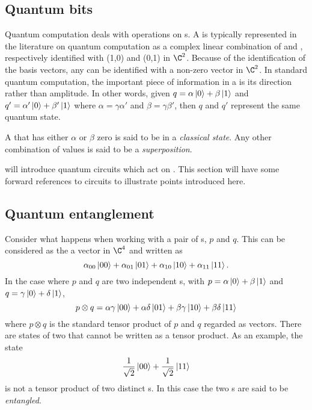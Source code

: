 \subsection{Quantum bits} %
\label{sub:quantum_bits}

Quantum computation deals with operations on \qubit{}s. A \qubit{} is typically represented in the
literature on quantum computation as a complex linear combination of  and ,
respectively identified with (1,0) and (0,1) in $\C^2$. Because of the identification of the basis
vectors, any \qubit{} can be identified with a non-zero vector in $\C^2$. In standard quantum
computation, the important piece of information in a \qubit{} is its direction rather than
amplitude. In other words, given $q=\alpha\left\vert{0}\right\rangle+\beta\left\vert{1}\right\rangle$ and
$q'=\alpha'\left\vert{0}\right\rangle+\beta'\left\vert{1}\right\rangle$ where $\alpha = \gamma\alpha'$ and $\beta = \gamma\beta'$, then
$q$ and $q'$ represent the same quantum state.

A \qubit{} that has either $\alpha$ or $\beta$ zero is said to be in a \emph{classical state}. Any
other combination of values is said to be a \emph{superposition}.

 will introduce quantum circuits which act on \qubits{}. This section
will have some forward references to circuits to illustrate points introduced here.


\subsection{Quantum entanglement} %
\label{sub:quantum_entanglement}

Consider what happens when working with a pair of \qubit{}s, $p$ and $q$. This can be considered as
the a vector in $\C^4$ and written as
\begin{equation}
  \alpha_{00}\left\vert{00}\right\rangle+\alpha_{01}\left\vert{01}\right\rangle+\alpha_{10}\left\vert{10}\right\rangle+
  \alpha_{11}\left\vert{11}\right\rangle.\label{eq:appTwoqubits}
\end{equation}
In the case where $p$ and $q$ are two independent \qubit{}s, with $p=\alpha\left\vert{0}\right\rangle+\beta\left\vert{1}\right\rangle$
and $q=\gamma\left\vert{0}\right\rangle+\delta\left\vert{1}\right\rangle$,
\begin{equation}
  p \otimes q = \alpha\gamma\left\vert{00}\right\rangle+\alpha\delta\left\vert{01}\right\rangle+\beta\gamma\left\vert{10}\right\rangle+\beta\delta\left\vert{11}\right\rangle
\end{equation}
where $p \otimes q$ is the standard tensor product of $p$ and $q$ regarded as vectors. There are
states of two \qubits{} that cannot be written as a tensor product. As an example, the state
\begin{equation}
  \frac{1}{\sqrt{2}}\left\vert{00}\right\rangle + \frac{1}{\sqrt{2}}\left\vert{11}\right\rangle\label{eq:appEntangledqubits}
\end{equation}
is not a tensor product of two distinct \qubit{}s. In this case the two \qubit{}s are said to be
\emph{entangled}.

